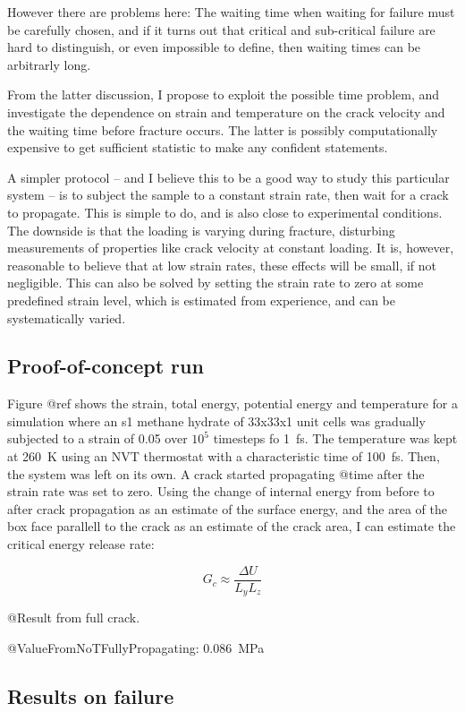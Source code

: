However there are problems here: The waiting time when waiting for failure must be carefully chosen, and if it turns out that critical and sub-critical failure are hard to distinguish, or even impossible to define, then waiting times can be arbitrarly long. 

From the latter discussion, I propose to exploit the possible time problem, and investigate the dependence on strain and temperature on the crack velocity and the waiting time before fracture occurs. The latter is possibly computationally expensive to get sufficient statistic to make any confident statements. 

A simpler protocol -- and I believe this to be a good way to study this particular system -- is to subject the sample to a constant strain rate, then wait for a crack to propagate. This is simple to do, and is also close to experimental conditions. The downside is that the loading is varying during fracture, disturbing measurements of properties like crack velocity at constant loading. It is, however, reasonable to believe that at low strain rates, these effects will be small, if not negligible. This can also be solved by setting the strain rate to zero at some predefined strain level, which is estimated from experience, and can be systematically varied. 


\subsection{Proof-of-concept run}
Figure @ref shows the strain, total energy, potential energy and temperature for a simulation where an s1 methane hydrate of 33x33x1 unit cells was gradually subjected to a strain of 0.05 over $10^5$ timesteps fo \SI{1}{\femto\second}. The temperature was kept at \SI{260}{\kelvin} using an NVT thermostat with a characteristic time of \SI{100}{\femto\second}. Then, the system was left on its own. A crack started propagating @time after the strain rate was set to zero. Using the change of internal energy from before to after crack propagation as an estimate of the surface energy, and the area of the box face parallell to the crack as an estimate of the crack area, I can estimate the critical energy release rate:

\begin{equation}
	G_c \approx \frac{\Delta U}{L_yL_z}
\end{equation}

@Result from full crack.

@ValueFromNoTFullyPropagating: \SI{0.086}{\mega\pascal\meter@@}

\subsection{Results on failure}